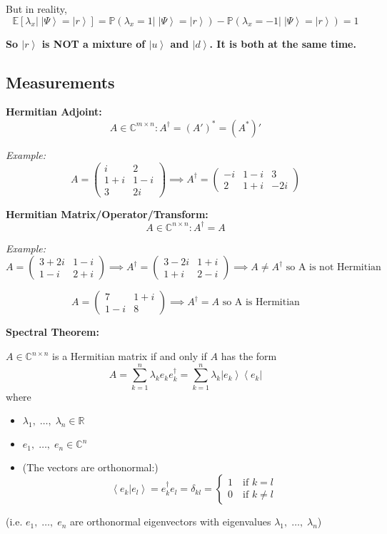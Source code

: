 \documentclass[12pt]{article}
\renewcommand{\P}{\mathbb{P}}
\newcommand{\R}{\mathbb{R}}
\newcommand{\brak}[1]{\left\langle #1 \right\rangle}
\newcommand{\C}{\mathbb{C}}
\newcommand{\bra}[1]{\left\langle #1 \right\vert }
\newcommand{\ket}[1]{\left\vert #1 \right\rangle}
\newcommand{\E}{\mathbb{E}}
\begin{document}
But in reality, 
\[\E[\lambda_x | \; \ket \Psi = \ket r] = \P(\lambda_x = 1 | \; \ket{\Psi} = \ket{r}) - \P(\lambda_x = -1 | \; \ket{\Psi} = \ket{r}) = 1\]

\textbf{So $\ket{r}$ is NOT a mixture of $\ket{u}$ and $\ket{d}$. It is both at the same time.}

\subsection*{Measurements}
\textbf{Hermitian Adjoint:}
\[A \in \C^{m \times n}: A^\dagger= (A')^* = (A^*)'\]

\emph{Example:}
\[A = \begin{pmatrix}
    i & 2\\
    1 + i & 1 - i\\
    3 & 2i
\end{pmatrix} \implies A^\dagger = \begin{pmatrix}
    -i & 1-i & 3\\
    2 & 1+i & -2i
\end{pmatrix}\]

\textbf{Hermitian Matrix/Operator/Transform:}
\[A \in \C^{n \times n}: A^\dagger = A\]

\emph{Example:}
\[A = \begin{pmatrix}
    3 + 2i & 1-i\\
    1 - i & 2 + i
\end{pmatrix} \implies A^\dagger = \begin{pmatrix}
    3 - 2i & 1 + i\\
    1 + i & 2-i
\end{pmatrix} \implies A \neq A^\dagger \text{ so A is not Hermitian}\]

\[A = \begin{pmatrix}
    7 & 1 + i\\
    1 - i & 8
\end{pmatrix} \implies A^\dagger = A \text{ so A is Hermitian}\]

\textbf{Spectral Theorem:}

$A \in \C^{n\times n}$ is a Hermitian matrix if and only if $A$ has the form 
\[A = \sum_{k=1}^n \lambda_k e_k e_k^\dagger = \sum_{k=1}^n \lambda_k \ket{e_k}\bra{e_k}\]
where 
\begin{itemize}
    \item $\lambda_1, \;\dots, \; \lambda_n \in \R$
    \item $e_1, \; \dots, \; e_n \in \C^n$
    \item (The vectors are orthonormal:)
    \[\brak{e_k | e_l} = e_k^\dagger e_l = \delta_{kl} = \begin{cases}
        1 \quad \text{if } k = l\\
        0 \quad \text{if } k \neq l
    \end{cases}\]
\end{itemize}
(i.e. $e_1, \; \dots, \; e_n$ are orthonormal eigenvectors with eigenvalues $\lambda_1, \;\dots, \; \lambda_n$)
\end{document}
